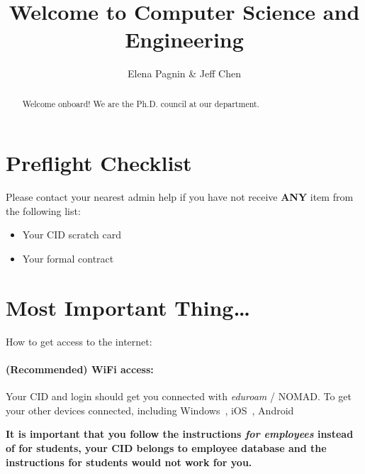 \documentclass[acmtog]{acmart}
\begin{document}
\title{Welcome to Computer Science and Engineering}

\author{Elena Pagnin \& Jeff Chen}


\begin{abstract}
  Welcome onboard! We are the Ph.D. council at our department.
\end{abstract}


\maketitle
\thispagestyle{empty}

\section{Preflight Checklist}
Please contact your nearest admin help if you have not receive \textbf{ANY} item from the following list:
\begin{itemize}
\item Your CID scratch card
\item Your formal contract      %
\end{itemize}


\section{Most Important Thing\dots}
\label{wifi}
How to get access to the internet:
\paragraph{(Recommended) WiFi access:}

  Your CID and login should get you connected with \emph{eduroam} / NOMAD.
  To get your other devices connected, including Windows~\cite{windowsWifi}, iOS~\cite{iosWifi}, Android~\cite{androidWifi} 

  \textbf{It is important that you follow the instructions \emph{for employees} instead of for students, your CID belongs to employee database and the instructions for students would not work for you.}
\end{document}
